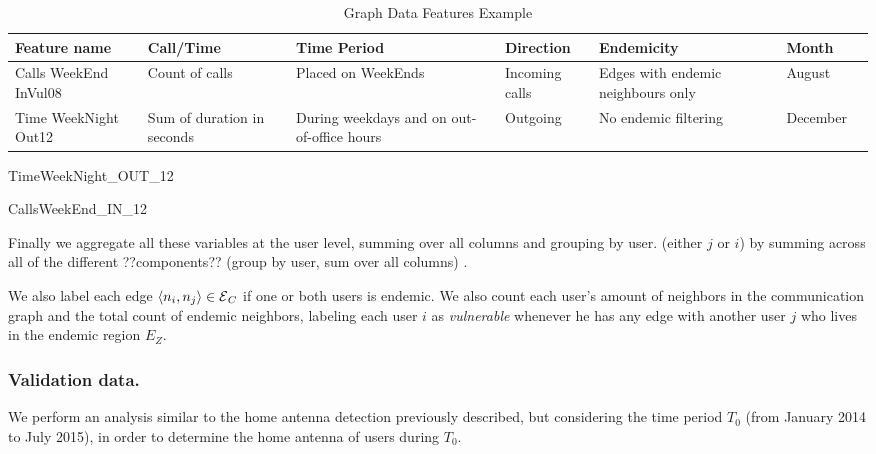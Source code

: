 \begin{table}[ht]
	\caption{Graph Data Features Example}
	\label{tab:data_example}
	\centering
	\begin{tabular} {|p{1.5cm}|p{1.5cm}|p{2cm}|p{1.5cm}|p{2cm}|p{1.5cm}|p{1cm}}
		\toprule
		Feature name & Call/Time & Time Period & Direction & Endemicity & Month\\
		\midrule
		Calls WeekEnd InVul08     & Count of calls & Placed on WeekEnds & Incoming calls & Edges with endemic neighbours only & August\\
		\midrule
		Time WeekNight Out12 & Sum of duration in seconds & During weekdays and on out-of-office hours & Outgoing  & No endemic filtering  & December \\
		
		\bottomrule
	\end{tabular}
\end{table}


 TimeWeekNight_OUT_12

 CallsWeekEnd_IN_12

Finally we aggregate all these variables at the user level, summing over all columns and grouping by user. 
 (either $j$ or $i$) by summing across all of the different ??components?? (group by user, sum over all columns) .

 We also label each edge $\left< n_i, n_j \right> \in \operatorname{\mathcal{E}}_C$ if one or both users is endemic.
We also count each user's amount of neighbors in the communication graph and the total count of endemic neighbors, labeling each user $i$ as \textit{vulnerable} whenever he has any edge with another user $j$ who lives in the endemic region $E_Z$. 




\subsubsection{Validation data.} %

We perform an analysis similar to the home antenna detection previously described, 
but considering the time period $T_0$ (from January 2014 to July 2015),
in order to determine the home antenna of users during $T_0$.

